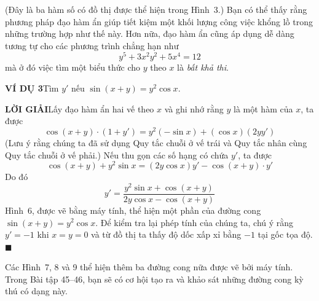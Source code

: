 \begin{minipage}[t]{0.69\textwidth}
    \vspace{0pt}
    (Đây là ba hàm số có đồ thị được thể hiện trong Hình~3.) Bạn có thể thấy rằng phương pháp đạo hàm ẩn giúp tiết kiệm một khối lượng công việc khổng lồ trong những trường hợp như thế này. Hơn nữa, đạo hàm ẩn cũng áp dụng dễ dàng tương tự cho các phương trình chẳng hạn như
    \begin{equation*}
    y^5 + 3x^2y^2 + 5x^4 = 12
    \end{equation*}
    mà ở đó việc tìm một biểu thức cho $y$ theo $x$ là \textit{bất khả thi}.

    \vspace{0.6em}
    \noindent\textbf{\textsf{\color{stewartcyan}VÍ DỤ 3}}\hspace{1em}Tìm $y'$ nếu $\sin(x + y) = y^2 \cos x$.

    \vspace{0.3em}
    \noindent\textbf{\textsf{\color{stewartcyan}LỜI GIẢI}}\hspace{1em}Lấy đạo hàm ẩn hai vế theo $x$ và ghi nhớ rằng $y$ là một hàm của $x$, ta được
    \begin{equation*}
    \cos(x + y) \cdot (1 + y') = y^2(-\sin x) + (\cos x)(2yy')
    \end{equation*}
    (Lưu ý rằng chúng ta đã sử dụng Quy tắc chuỗi ở vế trái và Quy tắc nhân cùng Quy tắc chuỗi ở vế phải.) Nếu thu gọn các số hạng có chứa $y'$, ta được
    \begin{equation*}
    \cos(x + y) + y^2 \sin x = (2y \cos x)y' - \cos(x + y) \cdot y'
    \end{equation*}
    Do đó
    \begin{equation*}
    y' = \frac{y^2 \sin x + \cos(x + y)}{2y \cos x - \cos(x + y)}
    \end{equation*}
    Hình~6, được vẽ bằng máy tính, thể hiện một phần của đường cong $\sin(x + y) = y^2 \cos x$. Để kiểm tra lại phép tính của chúng ta, chú ý rằng $y' = -1$ khi $x = y = 0$ và từ đồ thị ta thấy độ dốc xấp xỉ bằng $-1$ tại gốc tọa độ.\hfill{\color{stewartcyan}$\blacksquare$}

    \vspace{0.6em}
    Các Hình~7, 8 và 9 thể hiện thêm ba đường cong nữa được vẽ bởi máy tính. Trong Bài tập 45--46, bạn sẽ có cơ hội tạo ra và khảo sát những đường cong kỳ thú có dạng này.


\end{minipage}
